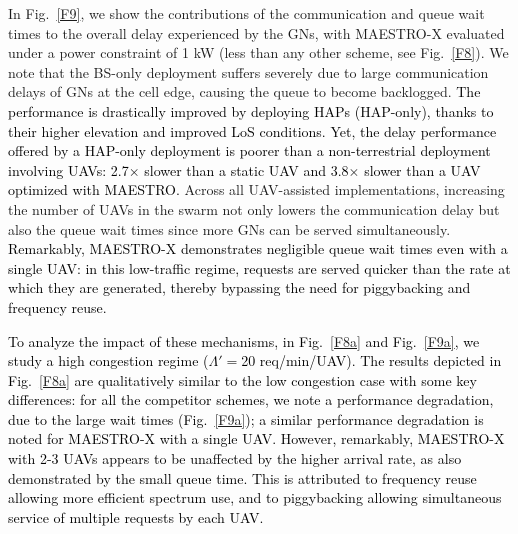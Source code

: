 \documentclass[10pt, twocolumn]{IEEEtran}
\theoremstyle{plain}
\theoremstyle{definition}
\theoremstyle{remark}
\newcommand\hlt[1]{\textcolor{black}{#1}}
\begin{document}
{In Fig.~\ref{F9}, we show the contributions of the communication and queue wait times to the overall delay experienced by the GNs, with MAESTRO-X evaluated under a power constraint of 1 kW (less than any other scheme, see Fig.~\ref{F8}).
 We note that the BS-only deployment suffers severely due to large
communication delays of GNs at the cell edge, causing the queue to become backlogged. 
 \hlt{The performance is drastically improved by deploying HAPs (HAP-only), thanks to their 
 higher elevation and improved LoS conditions. Yet, the delay performance offered by a HAP-only deployment is poorer than a non-terrestrial deployment involving UAVs: 2.7$\times$ slower than a static UAV and 3.8$\times$ slower than a UAV optimized with MAESTRO.} 
Across all UAV-assisted implementations, %
 increasing the number of UAVs in the swarm not only lowers the communication delay but also the queue wait times since more GNs can be served simultaneously. \hlt{Remarkably, MAESTRO-X demonstrates negligible queue wait times even with a single UAV: in this low-traffic regime, requests are served quicker than the rate at which they are generated, thereby bypassing the need for piggybacking and frequency reuse.}

\hlt{To analyze the impact of these mechanisms, in Fig.~\ref{F8a} and Fig.~\ref{F9a}, we study a high congestion regime ($\Lambda'{=}$20 req/min/UAV).
The results depicted in Fig.~\ref{F8a} are qualitatively similar to the low congestion case with some key differences: for all the competitor schemes, we note a performance degradation, due to the large wait times (Fig.~\ref{F9a}); a similar performance degradation is noted
for MAESTRO-X with a single UAV.
However, remarkably, MAESTRO-X with  2-3 UAVs  appears to be unaffected by the higher arrival rate, as also demonstrated by the small queue time. This is attributed to 
 frequency reuse allowing more efficient spectrum use, and to piggybacking  allowing simultaneous service of multiple requests by each UAV.}

}
\end{document}
